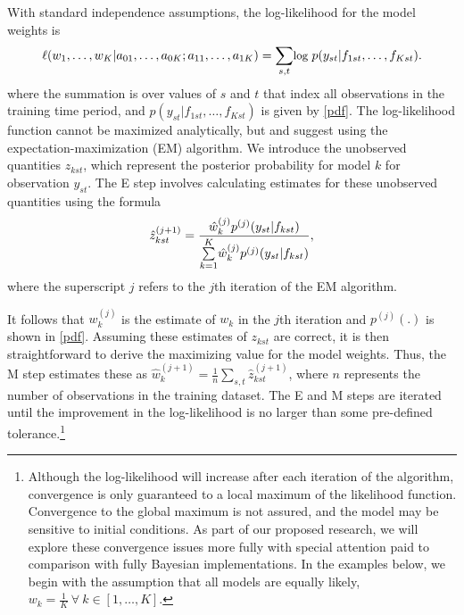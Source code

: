 \documentclass[pdftex,12pt,fullpage,oneside]{amsart}
\begin{document}
With standard independence assumptions, the log-likelihood for the
model weights is
\begin{equation}
\small
  \ell (w_1, \ldots, w_K | a_{01},  \ldots, a_{0K}; a_{11},
  \ldots, a_{1K})= \underset{s,t}{\sum}\mbox{log }p(y_{st} |
  f_{1st}, \ldots, f_{Kst}).
\end{equation}
\noindent where the summation is over values of $s$ and $t$ that index
all observations in the training time period, and $p(y_{st}|f_{1st},
\ldots, f_{Kst}) $ is given by \eqref{pdf}. The log-likelihood
function cannot be maximized analytically, but \citet{Raftery:2005}
and \citet{Sloughter:2007} suggest using the expectation-maximization
(EM) algorithm.  We introduce the unobserved quantities $z_{kst}$,
which represent the posterior probability for model $k$ for
observation $y_{st}$.  The E step involves calculating estimates for
these unobserved quantities using the formula
\begin{equation}
\small
\hat{z}^{(j+1)}_{kst} = \frac{\hat{w}^{(j)}_k
p^{(j)}(y_{st}|f_{kst})}{\overset{K}{\underset{k=1}{\sum}}\hat{w}^{(j)}_kp^{(j)}(y_{st}|f_{kst})},
\end{equation}
\noindent where the superscript $j$ refers to the $j$th iteration of
the EM algorithm.


It follows that $w_k^{(j)}$ is the estimate of $w_k$ in the $j$th
iteration and $p^{(j)}(.)$ is shown in \eqref{pdf}.  Assuming these
estimates of $z_{kst}$ are correct, it is then straightforward to
derive the maximizing value for the model weights. Thus, the M step
estimates these as
$\hat{w}^{(j+1)}_k=\frac{1}{n}\underset{s,t}{\sum}\hat{z}^{(j+1)}_{kst}$,
where $n$ represents the number of observations in the training
dataset.  The E and M steps are iterated until the improvement in the
log-likelihood is no larger than some pre-defined
tolerance.\footnote{Although the log-likelihood will increase after
  each iteration of the algorithm, convergence is only guaranteed to a
  local maximum of the likelihood function.  Convergence to the global
  maximum is not assured, and the model may be sensitive to initial
  conditions. As part of our proposed research, we will explore these
  convergence issues more fully with special attention paid to
  comparison with fully Bayesian implementations. In the examples
  below, we begin with the assumption that all models are equally
  likely, $w_k = \frac{1}{K} ~ \forall ~ k \in [1, \ldots, K]$.}


\end{document}
